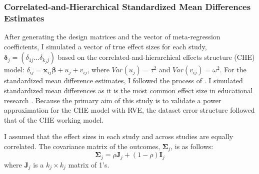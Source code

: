 
\subsubsection{Correlated-and-Hierarchical Standardized Mean Differences Estimates}

After generating the design matrices and the vector of meta-regression coefficients, I simulated a vector of true effect sizes for each study, $\mathbf{\delta}_j = (\delta_{1j} \dots \delta_{k_jj})$ based on the correlated-and-hierarchical effects structure (CHE) model: $ \delta_{ij} = \mathbf{x}_{ij}\boldsymbol{\beta} +  u_j + v_{ij}$,  where $Var(u_j) = \tau^2$ and $Var(v_{ij})= \omega^2$. For the standardized mean difference estimates, I followed the process of \textcite{pustejovsky2022, vembye2023}. I simulated standardized mean differences as it is the most common effect size in educational research \autocite{tipton2019}.  Because the primary aim of this study is to validate a power approximation for the CHE model with RVE, the dataset error structure followed that of the CHE working model. 


I assumed that the effect sizes in each study and across studies are equally correlated. The covariance matrix of the outcomes, $\mathbf{\Sigma}_j$, is as follows:
\begin{equation}
    \mathbf{\Sigma}_j = \rho \mathbf{J}_j + (1 - \rho)\mathbf{I}_j
\end{equation}
where $\mathbf{J}_j$ is a $k_j \times k_j$ matrix of 1's.

